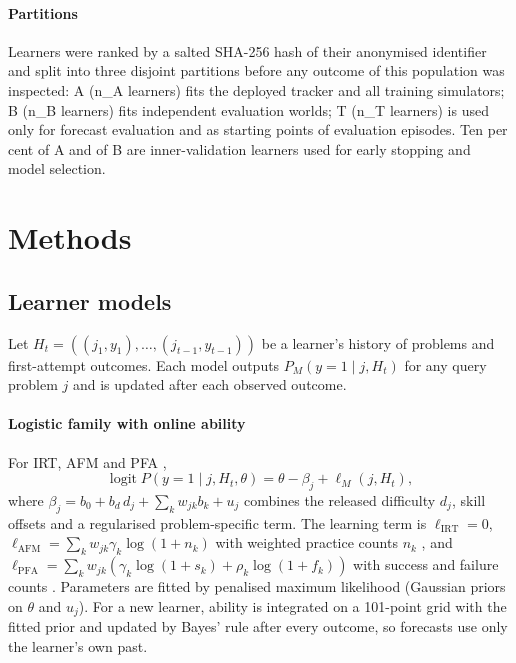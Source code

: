 \paragraph{Partitions} Learners were ranked by a salted SHA-256 hash of their anonymised identifier and split into three disjoint partitions before any outcome of this population was inspected: A ({{n_A}} learners) fits the deployed tracker and all training simulators; B ({{n_B}} learners) fits independent evaluation worlds; T ({{n_T}} learners) is used only for forecast evaluation and as starting points of evaluation episodes. Ten per cent of A and of B are inner-validation learners used for early stopping and model selection.

\section{Methods}\label{sec:methods}

\subsection{Learner models}\label{sec:learners}

Let $H_t=((j_1,y_1),\dots,(j_{t-1},y_{t-1}))$ be a learner's history of problems and first-attempt outcomes. Each model outputs $P_M(y=1\mid j,H_t)$ for any query problem $j$ and is updated after each observed outcome.

\paragraph{Logistic family with online ability} For IRT, AFM and PFA \citep[see][for an overview of this family]{pelanek2017learner},
\begin{equation}
\operatorname{logit} P(y=1\mid j,H_t,\theta) = \theta - \beta_j + \ell_M(j,H_t),
\label{eq:logistic}
\end{equation}
where $\beta_j = b_0 + b_d\,d_j + \sum_k w_{jk} b_k + u_j$ combines the released difficulty $d_j$, skill offsets and a regularised problem-specific term. The learning term is $\ell_{\mathrm{IRT}}=0$, $\ell_{\mathrm{AFM}}=\sum_k w_{jk}\gamma_k\log(1+n_k)$ with weighted practice counts $n_k$ \citep{cen2006lfa}, and $\ell_{\mathrm{PFA}}=\sum_k w_{jk}(\gamma_k\log(1+s_k)+\rho_k\log(1+f_k))$ with success and failure counts \citep{pavlik2009pfa}. Parameters are fitted by penalised maximum likelihood (Gaussian priors on $\theta$ and $u_j$). For a new learner, ability is integrated on a 101-point grid with the fitted prior and updated by Bayes' rule after every outcome, so forecasts use only the learner's own past.

